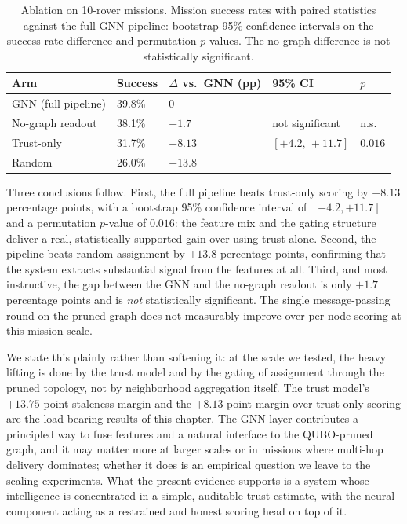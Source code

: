 \begin{table}[t]
  \centering
  \caption{Ablation on 10-rover missions. Mission success rates with paired
  statistics against the full GNN pipeline: bootstrap 95\% confidence
  intervals on the success-rate difference and permutation $p$-values.
  The no-graph difference is not statistically significant.}
  \label{tab:ablation}
  \begin{tabular}{lllll}
    \toprule
    Arm & Success & $\Delta$ vs.\ GNN (pp) & 95\% CI & $p$ \\
    \midrule
    GNN (full pipeline) & 39.8\% & $0$ & & \\
    No-graph readout & 38.1\% & $+1.7$ & not significant & n.s. \\
    Trust-only & 31.7\% & $+8.13$ & $[+4.2,\, +11.7]$ & $0.016$ \\
    Random & 26.0\% & $+13.8$ & & \\
    \bottomrule
  \end{tabular}
\end{table}

Three conclusions follow. First, the full pipeline beats trust-only scoring
by $+8.13$ percentage points, with a bootstrap 95\% confidence interval of
$[+4.2, +11.7]$ and a permutation $p$-value of $0.016$: the feature mix and
the gating structure deliver a real, statistically supported gain over using
trust alone. Second, the pipeline beats random assignment by $+13.8$
percentage points, confirming that the system extracts substantial signal
from the features at all. Third, and most instructive, the gap between the
GNN and the no-graph readout is only $+1.7$ percentage points and is
\emph{not} statistically significant. The single message-passing round on
the pruned graph does not measurably improve over per-node scoring at this
mission scale.

We state this plainly rather than softening it: at the scale we tested, the
heavy lifting is done by the trust model and by the gating of assignment
through the pruned topology, not by neighborhood aggregation itself. The
trust model's $+13.75$ point staleness margin and the $+8.13$ point margin
over trust-only scoring are the load-bearing results of this chapter. The
GNN layer contributes a principled way to fuse features and a natural
interface to the QUBO-pruned graph, and it may matter more at larger scales
or in missions where multi-hop delivery dominates; whether it does is an
empirical question we leave to the scaling experiments. What the present
evidence supports is a system whose intelligence is concentrated in a simple,
auditable trust estimate, with the neural component acting as a restrained
and honest scoring head on top of it.
